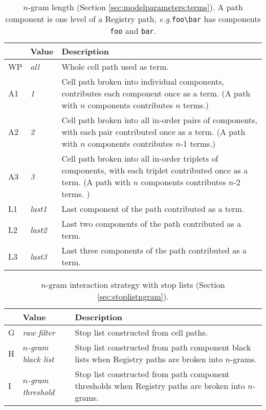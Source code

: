 \documentclass[11pt]{ucthesis}
\theoremstyle{plain}
\theoremstyle{definition}
\newcommand{\eg}{\emph{e.g.}\xspace}
\newcommand{\breakingbackslash}{\textbackslash\allowbreak{}}
\begin{document}
\begin{table}[htp]
\begin{small}
\caption{\label{tbl:paramenum:ngrams}$n$-gram length (Section \ref{sec:modelparameters:terms}).  A path component is one level of a Registry path, \eg \texttt{foo{\breakingbackslash}bar} has components \texttt{foo} and \texttt{bar}.}
\begin{center}
\begin{tabular}{llp{4in}}
\toprule
 & Value & Description \\
\midrule
WP & \emph{all} & Whole cell path used as term. \\
A1 & \emph{1} & Cell path broken into individual components, contributes each component once as a term.  (A path with $n$ components contributes $n$ terms.) \\
A2 & \emph{2} & Cell path broken into all in-order pairs of components, with each pair contributed once as a term. (A path with $n$ components contributes $n$-1 terms.) \\
A3 & \emph{3} & Cell path broken into all in-order triplets of components, with each triplet contributed once as a term. (A path with $n$ components contributes $n$-2 terms. ) \\
L1 & \emph{last1} & Last component of the path contributed as a term. \\
L2 & \emph{last2} & Last two components of the path contributed as a term. \\
L3 & \emph{last3} & Last three components of the path contributed as a term. \\
\bottomrule
\end{tabular}
\end{center}
\end{small}
\end{table}

\begin{table}[htp]
\begin{small}
\caption{\label{tbl:paramenum:ngramstoplist}$n$-gram interaction strategy with stop lists (Section \ref{sec:stoplistngram}).}
\begin{center}
\begin{tabular}{llp{4in}}
\toprule
 & Value & Description \\
\midrule
G & \emph{raw filter} & Stop list constructed from cell paths. \\
H & \emph{$n$-gram black list} & Stop list constructed from path component black lists when Registry paths are broken into $n$-grams. \\
I & \emph{$n$-gram threshold} & Stop list constructed from path component thresholds when Registry paths are broken into $n$-grams. \\
\bottomrule
\end{tabular}
\end{center}
\end{small}
\end{table}
\end{document}
